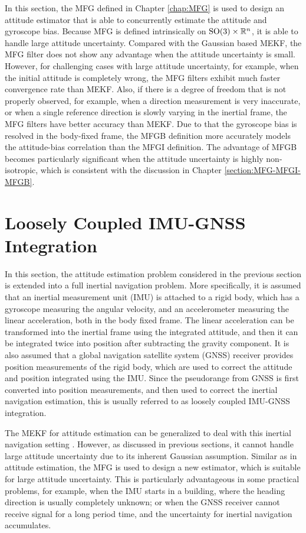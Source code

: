 In this section, the MFG defined in Chapter \ref{chap:MFG} is used to design an attitude estimator that is able to concurrently estimate the attitude and gyroscope bias.
Because MFG is defined intrinsically on $\mathrm{SO}(3)\times \mathbb{R}^n$, it is able to handle large attitude uncertainty.
Compared with the Gaussian based MEKF, the MFG filter does not show any advantage when the attitude uncertainty is small.
However, for challenging cases with large attitude uncertainty, for example, when the initial attitude is completely wrong, the MFG filters exhibit much faster convergence rate than MEKF.
Also, if there is a degree of freedom that is not properly observed, for example, when a direction measurement is very inaccurate, or when a single reference direction is slowly varying in the inertial frame, the MFG filters have better accuracy than MEKF.
Due to that the gyroscope bias is resolved in the body-fixed frame, the MFGB definition more accurately models the attitude-bias correlation than the MFGI definition.
The advantage of MFGB becomes particularly significant when the attitude uncertainty is highly non-isotropic, which is consistent with the discussion in Chapter \ref{section:MFG-MFGI-MFGB}.

\section{Loosely Coupled IMU-GNSS Integration}

In this section, the attitude estimation problem considered in the previous section is extended into a full inertial navigation problem.
More specifically, it is assumed that an inertial measurement unit (IMU) is attached to a rigid body, which has a gyroscope measuring the angular velocity, and an accelerometer measuring the linear acceleration, both in the body fixed frame.
The linear acceleration can be transformed into the inertial frame using the integrated attitude, and then it can be integrated twice into position after subtracting the gravity component.
It is also assumed that a global navigation satellite system (GNSS) receiver provides position measurements of the rigid body, which are used to correct the attitude and position integrated using the IMU.
Since the pseudorange from GNSS is first converted into position measurements, and then used to correct the inertial navigation estimation, this is usually referred to as loosely coupled IMU-GNSS integration.

The MEKF for attitude estimation can be generalized to deal with this inertial navigation setting \cite{sola2017quaternion}.
However, as discussed in previous sections, it cannot handle large attitude uncertainty due to its inherent Gaussian assumption.
Similar as in attitude estimation, the MFG is used to design a new estimator, which is suitable for large attitude uncertainty.
This is particularly advantageous in some practical problems, for example, when the IMU starts in a building, where the heading direction is usually completely unknown; or when the GNSS receiver cannot receive signal for a long period time, and the uncertainty for inertial navigation accumulates.

